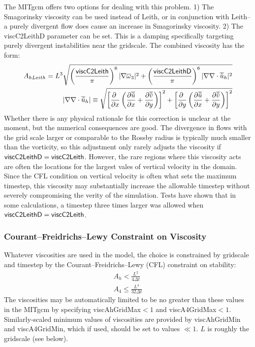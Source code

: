 The MITgcm offers two options for dealing with this problem.  1) The
Smagorinsky viscosity can be used instead of Leith, or in conjunction
with Leith--a purely divergent flow does cause an increase in
Smagorinsky viscosity.  2) The {\sf viscC2LeithD} parameter can be
set.  This is a damping specifically targeting purely divergent
instabilities near the gridscale.  The combined viscosity has the
form:
\begin{eqnarray}
A_{hLeith}=L^3\sqrt{\left(\frac{{\sf viscC2Leith}}{\pi}\right)^6|\nabla \av \omega_3|^2+\left(\frac{{\sf viscC2LeithD}}{\pi}\right)^6|\nabla \nabla\cdot \av {\tilde u}_h|^2}\nonumber\\
|\nabla \nabla\cdot \av {\tilde u}_h|\equiv\sqrt{\left[\pd{x}{\ }\left(\pd{x}{\av \tu}+\pd{y}{\av \tv}\right)\right]^2+\left[\pd{y}{\ }\left(\pd{x}{\av \tu}+\pd{y}{\av \tv}\right)\right]^2}
\end{eqnarray}
Whether there is any physical rationale for this correction is unclear
at the moment, but the numerical consequences are good.  The
divergence in flows with the grid scale larger or comparable to the
Rossby radius is typically much smaller than the vorticity, so this
adjustment only rarely adjusts the viscosity if ${\sf
  viscC2LeithD}={\sf viscC2Leith}$.  However, the rare regions where
this viscosity acts are often the locations for the largest vales of
vertical velocity in the domain.  Since the CFL condition on vertical
velocity is often what sets the maximum timestep, this viscosity may
substantially increase the allowable timestep without severely
compromising the verity of the simulation.  Tests have shown that in
some calculations, a timestep three times larger was allowed when
${\sf viscC2LeithD}={\sf viscC2Leith}$.

\subsubsection{Courant--Freidrichs--Lewy Constraint on Viscosity}
Whatever viscosities are used in the model, the choice is constrained
by gridscale and timestep by the Courant--Freidrichs--Lewy (CFL)
constraint on stability:
\begin{eqnarray}
A_h<\frac{L^2}{4\Delta t}\nonumber\\
A_4 \le \frac{L^4}{32\Delta t}\nonumber
\end{eqnarray}
The viscosities may be automatically limited to be no greater than
these values in the MITgcm by specifying {\sf viscAhGridMax}$<1$ and
{\sf viscA4GridMax}$<1$.  Similarly-scaled minimum values of
viscosities are provided by {\sf viscAhGridMin} and {\sf
  viscA4GridMin}, which if used, should be set to values $\ll 1$. $L$
is roughly the gridscale (see below).

